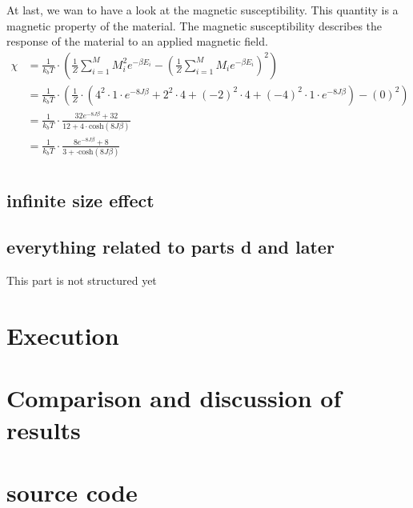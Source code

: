 \documentclass[10pt,a4paper]{article}
\begin{document}
At last, we wan to have a look at the magnetic susceptibility. This quantity is a magnetic property of the material. The magnetic susceptibility describes the response of the material to an applied magnetic field. 
\begin{align}
\chi &= \frac{1}{k_b T} \cdot \left( \frac{1}{Z} \sum_{i=1}^{M} M_i^2 e^{- \beta E_i } - \left( \frac{1}{Z} \sum_{i=1}^{M} M_i e^{- \beta E_i }  \right)^2 \right)\\
&= \frac{1}{k_b T} \cdot \left( \frac{1}{Z} \cdot \left( 4^2 \cdot 1 \cdot e^{-8J\beta}+ 2^2 \cdot 4+(-2)^2 \cdot 4 + (-4)^2 \cdot 1 \cdot e^{-8J \beta } \right) - \left( 0  \right)^2 \right)\\
&= \frac{1}{k_b T} \cdot \frac{32 e^{-8J\beta}+32}{ 12+ 4 \cdot \mathrm{cosh} \left( 8J \beta \right)}\\
&= \frac{1}{k_b T} \cdot \frac{8 e^{-8J\beta}+8}{ 3+ \cdot \mathrm{cosh} \left( 8J \beta \right)}\\
\end{align}

\subsection{infinite size effect}
\subsection{everything related to parts d and later}

This part is not structured yet
\section{Execution}

\section{Comparison and discussion of results}

\section{source code}
\end{document}
